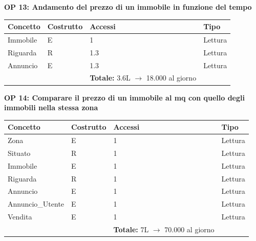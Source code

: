 \documentclass[a4paper,12pt]{report}
\begin{document}
            \noindent
            \textbf{OP 13: Andamento del prezzo di un immobile in funzione del tempo}
        	\begin{table}[H]
            \centering
             \begin{tabular}{llll}
             \rowcolor{yellow!20} \textbf{Concetto} & \textbf{Costrutto} & \textbf{Accessi} & \textbf{Tipo}\\ [0.5ex] 
             \hline
             Immobile & E & 1 & Lettura \\ 
             Riguarda & R & 1.3 & Lettura \\ 
             Annuncio & E & 1.3 & Lettura \\ 
             \hline
                \rowcolor{yellow!20} &   & \textbf{Totale:} 3.6L $\rightarrow$ 18.000 al giorno &  \\ [1ex] 
             
             \end{tabular}
            \end{table}

            \newpage
            \noindent
            \textbf{OP 14: Comparare il prezzo di un immobile al mq con quello degli immobili nella stessa zona}
        	\begin{table}[H]
            \centering
             \begin{tabular}{llll}
             \rowcolor{yellow!20} \textbf{Concetto} & \textbf{Costrutto} & \textbf{Accessi} & \textbf{Tipo}\\ [0.5ex] 
             \hline
             Zona & E & 1 & Lettura \\ 
             Situato & R & 1 & Lettura \\ 
             Immobile & E & 1 & Lettura \\ 
             Riguarda & R & 1 & Lettura \\ 
             Annuncio & E & 1 & Lettura \\ 
             Annuncio\_Utente & E & 1 & Lettura \\ 
             Vendita & E & 1 & Lettura \\ 
             \hline
                \rowcolor{yellow!20} &   & \textbf{Totale:} 7L $\rightarrow$ 70.000 al giorno &  \\ [1ex] 
             
             \end{tabular}
            \end{table}
\end{document}

